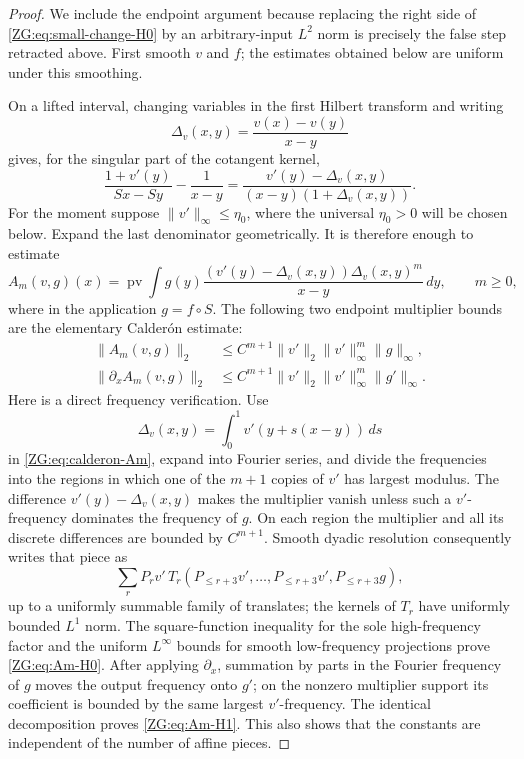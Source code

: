 \documentclass[11pt]{amsart}
\numberwithin{equation}{section}
\theoremstyle{definition}
\theoremstyle{remark}
\begin{document}
\begin{proof}
We include the endpoint argument because replacing the right side of
\eqref{ZG:eq:small-change-H0} by an arbitrary-input $L^2$ norm is precisely
the false step retracted above.  First smooth $v$ and $f$; the estimates
obtained below are uniform under this smoothing.

On a lifted interval, changing variables in the first Hilbert transform
and writing
\[
 \Delta_v(x,y)=\frac{v(x)-v(y)}{x-y}
\]
gives, for the singular part of the cotangent kernel,
\begin{equation}\label{ZG:eq:calderon-kernel}
 \frac{1+v'(y)}{Sx-Sy}-\frac1{x-y}
 =\frac{v'(y)-\Delta_v(x,y)}
 {(x-y)(1+\Delta_v(x,y))}.
\end{equation}
For the moment suppose $\|v'\|_\infty\le\eta_0$, where the universal
$\eta_0>0$ will be chosen below.  Expand the last denominator
geometrically.  It is therefore enough to estimate
\begin{equation}\label{ZG:eq:calderon-Am}
 A_m(v,g)(x)=\operatorname {pv}\!\int
 g(y)\frac{(v'(y)-\Delta_v(x,y))
                 \Delta_v(x,y)^m}{x-y}\,dy,
 \qquad m\ge0,
\end{equation}
where in the application $g=f\circ S$.  The following two endpoint
multiplier bounds are the elementary Calder\'on estimate:
\begin{align}
 \|A_m(v,g)\|_2
 &\le C^{m+1}\|v'\|_2\|v'\|_\infty^m\|g\|_\infty,
 \label{ZG:eq:Am-H0}\\
 \|\partial_xA_m(v,g)\|_2
 &\le C^{m+1}\|v'\|_2\|v'\|_\infty^m\|g'\|_\infty.
 \label{ZG:eq:Am-H1}
\end{align}
Here is a direct frequency verification.  Use
\[
 \Delta_v(x,y)=\int_0^1v'(y+s(x-y))\,ds
\]
in \eqref{ZG:eq:calderon-Am}, expand into Fourier series, and divide the
frequencies into the regions in which one of the $m+1$ copies of $v'$
has largest modulus.  The difference
$v'(y)-\Delta_v(x,y)$ makes the multiplier vanish unless such a
$v'$-frequency dominates the frequency of $g$.  On each region the
multiplier and all its discrete differences are bounded by $C^{m+1}$.
Smooth dyadic resolution consequently writes that piece as
\[
 \sum_r P_rv'\,
 T_r(P_{\le r+3}v',\ldots,P_{\le r+3}v',P_{\le r+3}g),
\]
up to a uniformly summable family of translates; the kernels of $T_r$
have uniformly bounded $L^1$ norm.  The square-function inequality for
the sole high-frequency factor and the uniform $L^\infty$ bounds for
smooth low-frequency projections prove \eqref{ZG:eq:Am-H0}.  After applying
$\partial_x$, summation by parts in the Fourier frequency of $g$ moves
the output frequency onto $g'$; on the nonzero multiplier support its
coefficient is bounded by the same largest $v'$-frequency.  The identical
decomposition proves \eqref{ZG:eq:Am-H1}.  This also shows that the constants
are independent of the number of affine pieces.


\end{proof}
\end{document}
